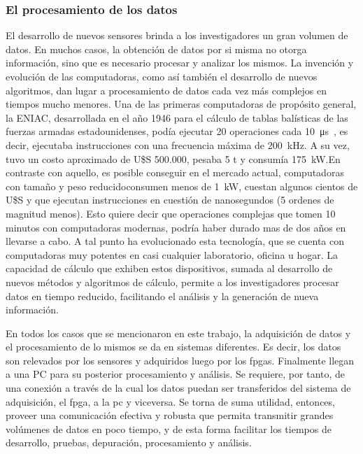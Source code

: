 \subsubsection{El procesamiento de los datos}
El desarrollo de nuevos sensores brinda a los investigadores un gran volumen de datos. En muchos casos, la obtención de datos por si misma no otorga información, sino que es necesario procesar y analizar los mismos. La invención y evolución de las computadoras, como así también el desarrollo de nuevos algoritmos, dan lugar a procesamiento de datos cada vez más complejos en tiempos mucho menores.
Una de las primeras computadoras de propósito general, la ENIAC,  desarrollada en el año 1946 para el cálculo de tablas balísticas de las fuerzas armadas estadounidenses, podía ejecutar 20 operaciones cada \SI{10}{\micro\second}~\cite{Goldstine1946}, es decir, ejecutaba instrucciones con una frecuencia máxima de \SI{200}{\kilo\hertz}. A su vez, tuvo un costo aproximado de U\$S 500.000, pesaba 5 t y consumía \SI{175}{\kilo\watt}.En contraste con aquello, es posible conseguir en el mercado actual, computadoras con tamaño y peso reducidoconsumen menos de \SI{1}{\kilo\watt}, cuestan algunos cientos de U\$S y que ejecutan instrucciones en cuestión de nanosegundos (5 ordenes de magnitud menos). Esto quiere decir que operaciones complejas que tomen 10 minutos con computadoras modernas, podría haber durado mas de dos años en llevarse a cabo. A tal punto ha evolucionado esta tecnología, que se cuenta con computadoras muy potentes en casi cualquier laboratorio, oficina u hogar. La capacidad de cálculo que exhiben estos dispositivos, sumada al desarrollo de nuevos métodos y algoritmos de cálculo, permite a los investigadores procesar datos en tiempo reducido, facilitando el análisis y la generación de nueva información.%

En todos los casos que se mencionaron en este trabajo, la adquisición de datos y el procesamiento de lo mismos se da en sistemas diferentes. Es decir, los datos son relevados por los sensores y adquiridos luego por los \acrshort{fpga}s. Finalmente llegan a una PC para su posterior procesamiento y análisis. Se requiere, por tanto, de una conexión a través de la cual los datos puedan ser transferidos del sistema de adquisición, el \acrshort{fpga}, a la \acrshort{pc} y viceversa. Se torna de suma utilidad, entonces, proveer una comunicación efectiva y robusta que permita transmitir grandes volúmenes de datos en poco tiempo, y de esta forma facilitar los tiempos de desarrollo, pruebas, depuración, procesamiento y análisis.%

